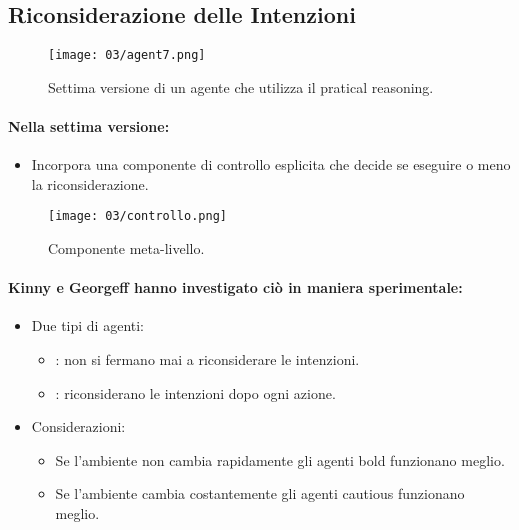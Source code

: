 \pagebreak
\subsection{Riconsiderazione delle Intenzioni}

\begin{figure}[!h]
    \centering
    \texttt{[image: 03/agent7.png]}
  \caption{Settima versione di un agente che utilizza il pratical reasoning.}
\end{figure}

\paragraph{Nella settima versione:}

\begin{itemize}
  \item Incorpora una componente di controllo esplicita  che decide se eseguire o meno la riconsiderazione. 
\end{itemize}

\begin{figure}[!h]
    \centering
    \texttt{[image: 03/controllo.png]}
  \caption{Componente meta-livello.}
\end{figure}


\paragraph{Kinny e Georgeff hanno investigato ciò in maniera sperimentale:}

\begin{itemize}
  \item Due tipi di agenti: 
    \begin{itemize}
      \item {}: non si fermano mai a riconsiderare le intenzioni. 
      \item {}: riconsiderano le intenzioni dopo ogni azione.
    \end{itemize}
  \item Considerazioni:
    \begin{itemize}
      \item Se l'ambiente non cambia rapidamente gli agenti bold funzionano meglio. 
      \item Se l'ambiente cambia costantemente gli agenti cautious funzionano meglio.
    \end{itemize}
\end{itemize}






